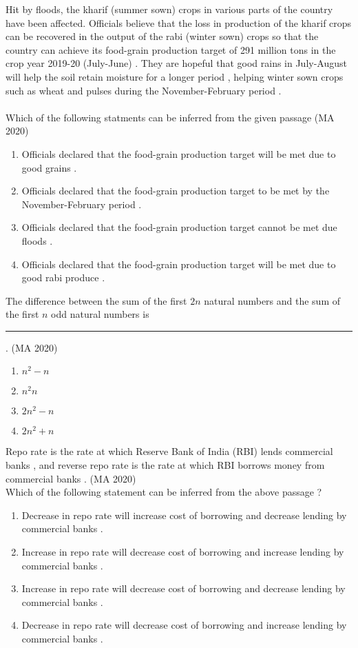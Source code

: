 \item  	Hit by floods, the kharif (summer sown) crops in various parts of the country have been affected. Officials believe that the loss in production of the kharif crops can be recovered in the output of the rabi (winter sown) crops so that the country can achieve its food-grain production target of 291 million tons in the crop year 2019-20 (July-June) . They are hopeful that good rains in July-August will help the soil retain moisture for a longer period , helping winter sown crops such as wheat and pulses during the November-February period .
\\
\\
Which of the following statments can be inferred from the given passage
\hfill{(MA 2020)}
\begin{enumerate}
\item Officials declared that the food-grain production target will be met due to good grains .
\item Officials declared that the food-grain production target to be met by the November-February period .
\item Officials declared that the food-grain production target cannot be met due floods .
\item Officials declared that the food-grain production target will be met due to good rabi produce .
\end{enumerate}
 
 
 \item The difference between the sum of the first $2n$ natural numbers and the sum of the first $n$ odd natural numbers is \rule{2cm}{0.4pt} .
  \hfill{(MA 2020)}
 \begin{enumerate}
\item $n^2-n$
\item $n^2n$
\item $2n^2-n$
\item $2n^2+n$
\end{enumerate}


 \item Repo rate is the rate at which Reserve Bank of India (RBI) lends commercial banks , and reverse repo rate is the rate at which RBI borrows money from commercial banks .
 \hfill{(MA 2020)}
 \\ 
Which of the following statement can be inferred from the above passage ?

 \begin{enumerate}
\item Decrease in repo rate will increase cost of borrowing and decrease lending by commercial banks .
\item Increase in repo rate will decrease cost of borrowing and increase lending by commercial banks .
\item Increase in repo rate will decrease cost of borrowing and decrease lending by commercial banks .
\item Decrease in repo rate will decrease cost of borrowing and increase lending by commercial banks .
\end{enumerate}

